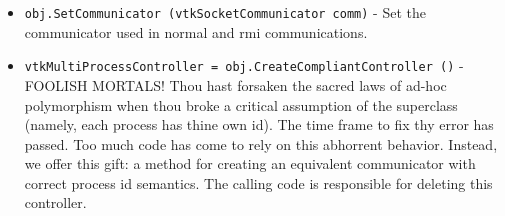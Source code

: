 \begin{itemize}
\item  \verb|obj.SetCommunicator (vtkSocketCommunicator comm)| -  Set the communicator used in normal and rmi communications.

\item  \verb|vtkMultiProcessController = obj.CreateCompliantController ()| -  FOOLISH MORTALS!  Thou hast forsaken the sacred laws of ad-hoc polymorphism
 when thou broke a critical assumption of the superclass (namely, each
 process has thine own id).  The time frame to fix thy error has passed.
 Too much code has come to rely on this abhorrent behavior.  Instead, we
 offer this gift: a method for creating an equivalent communicator with
 correct process id semantics.  The calling code is responsible for
 deleting this controller.

\end{itemize}
